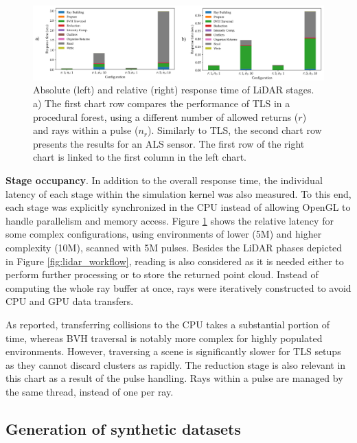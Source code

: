 \begin{figure}
    \centering
    \includegraphics[width=\linewidth]{figs/lidar_simulation/lidar_response_time_stage.png}
	\caption{Absolute (left) and relative (right) response time of LiDAR stages. a) The first chart row compares the performance of TLS in a procedural forest, using a different number of allowed returns ($r$) and rays within a pulse ($n_r$). Similarly to TLS, the second chart row presents the results for an ALS sensor. The first row of the right chart is linked to the first column in the left chart.}
	\label{fig:lidar_response_time_chart}
\end{figure}

\textbf{Stage occupancy}. In addition to the overall response time, the individual latency of each stage within the simulation kernel was also measured. To this end, each stage was explicitly synchronized in the CPU instead of allowing OpenGL to handle parallelism and memory access. Figure \ref{fig:lidar_response_time_chart} shows the relative latency for some complex configurations, using environments of lower (5M) and higher complexity (10M), scanned with 5M pulses. Besides the LiDAR phases depicted in Figure \ref{fig:lidar_workflow}, reading is also considered as it is needed either to perform further processing or to store the returned point cloud. Instead of computing the whole ray buffer at once, rays were iteratively constructed to avoid CPU and GPU data transfers.

As reported, transferring collisions to the CPU takes a substantial portion of time, whereas BVH traversal is notably more complex for highly populated environments. However, traversing a scene is significantly slower for TLS setups as they cannot discard clusters as rapidly. The reduction stage is also relevant in this chart as a result of the pulse handling. Rays within a pulse are managed by the same thread, instead of one per ray. 

\subsection{Generation of synthetic datasets}

